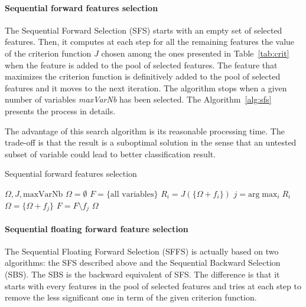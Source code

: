 \documentclass[journal,peerreview,onecolumn]{IEEEtran}
\begin{document}
            \paragraph{Sequential forward features selection}
            \label{sec:forward-presentation}

            The Sequential Forward Selection (SFS) starts with an empty set of selected features. Then, it computes at each step for all the remaining features the value of the criterion function $J$ chosen among the ones presented in Table~\ref{tab:crit} when the feature is added to the pool of selected features. The feature that maximizes the criterion function is definitively added to the pool of selected features and it moves to the next iteration. The algorithm stops when a given number of variables \emph{maxVarNb} has been selected. The Algorithm~\ref{alg:sfs} presents the process in details.

            The advantage of this search algorithm is its reasonable processing time. The trade-off is that the result is a suboptimal solution in the sense that an untested subset of variable could lead to better classification result.

            \begin{algorithm}
            \caption{Sequential forward features selection\label{alg:sfs}}
            {\footnotesize
            \begin{algorithmic}[1]
            \REQUIRE $\Omega,J,\text{maxVarNb}$
            \STATE $\Omega=\emptyset$
            \STATE $F=\text{\{all variables\}}$
            \STATE $R_i = J(\{\Omega + f_i\})$
            \ENDFOR
            \STATE $j=\text{arg} \max_{i} R_i$
            \STATE $\Omega = \{\Omega + f_j\}$
            \STATE $F = F \setminus f_j$
            \ENDWHILE
            \RETURN $\Omega$
            \end{algorithmic}
            }
            \end{algorithm}

            \paragraph{Sequential floating forward feature selection}
            \label{sec:floating-presentation}

            The Sequential Floating Forward Selection (SFFS)\cite{somol1999adaptive} is actually based on two algorithms: the SFS described above and the Sequential Backward Selection (SBS). The SBS is the backward equivalent of SFS. The difference is that it starts with every features in the pool of selected features and tries at each step to remove the less significant one in term of the given criterion function.
\end{document}
